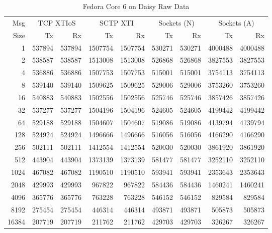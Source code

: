 \documentclass[letterpaper,final,notitlepage,twocolumn,10pt,twoside]{article}
\begin{document}
\begin{appendix}
\begin{table}[hbp]
\footnotesize
\begin{center}
\setlength{\tabcolsep}{0.2em}
\setlength{\arraycolsep}{0.2em}
\begin{tabular}{rrrrrrrrr}\\
Msg & \multicolumn{2}{c}{TCP XTIoS} & \multicolumn{2}{c}{SCTP XTI} & \multicolumn{2}{c}{Sockets (N)} & \multicolumn{2}{c}{Sockets (A)}\\
Size & Tx & Rx & Tx & Rx & Tx & Rx & Tx & Rx\\
\hline
\hline
1 & 537894 & 537894 & 1507754 & 1507754 & 530271 & 530271 & 4000488 & 4000488\\
2 & 538587 & 538587 & 1513008 & 1513008 & 526868 & 526868 & 3827553 & 3827553\\
4 & 536886 & 536886 & 1507753 & 1507753 & 515001 & 515001 & 3754113 & 3754113\\
8 & 539140 & 539140 & 1509625 & 1509625 & 529006 & 529006 & 3753260 & 3753260\\
16 & 540883 & 540883 & 1502556 & 1502556 & 525746 & 525746 & 3857426 & 3857426\\
32 & 537277 & 537277 & 1504196 & 1504196 & 524605 & 524605 & 4199442 & 4199442\\
64 & 529188 & 529188 & 1504607 & 1504607 & 519086 & 519086 & 4139794 & 4139794\\
128 & 524924 & 524924 & 1496666 & 1496666 & 516056 & 516056 & 4166290 & 4166290\\
256 & 502111 & 502111 & 1412554 & 1412554 & 520030 & 520030 & 3861920 & 3861920\\
512 & 443904 & 443904 & 1373139 & 1373139 & 581477 & 581477 & 3252110 & 3252110\\
1024 & 467082 & 467082 & 1190510 & 1190510 & 593941 & 593941 & 2353643 & 2353643\\
2048 & 429993 & 429993 & 967822 & 967822 & 584436 & 584436 & 1460241 & 1460241\\
4096 & 365776 & 365776 & 763228 & 763228 & 546152 & 546152 & 829584 & 829584\\
8192 & 275454 & 275454 & 446314 & 446314 & 493871 & 493871 & 505873 & 505873\\
16384 & 207719 & 207719 & 211762 & 211762 & 429703 & 429703 & 326267 & 326267\\
\hline
\end{tabular}
\end{center}
\normalsize
\caption[Fedora Core 6 on Daisy Raw Data]{Fedora Core 6 on Daisy Raw Data}
\label{table:rh72data}
\end{table}


\end{appendix}
\end{document}
